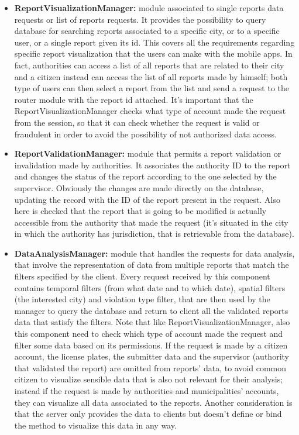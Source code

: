 \begin{itemize}
	\item \textbf{ReportVisualizationManager:}
	module associated to single reports data requests or list of reports requests. It provides the possibility to query database for searching reports associated to a specific city, or to a specific user, or a single report given its id. This covers all the requirements regarding specific report visualization that the users can make with the mobile apps. In fact, authorities can access a list of all reports that are related to their city and a citizen instead can access the list of all reports made by himself; both type of users can then select a report from the list and send a request to the router module with the report id attached. It's important that the ReportVisualizationManager checks what type of account made the request from the session, so that it can check whether the request is valid or fraudulent in order to avoid the possibility of not authorized data access. 
	\item \textbf{ReportValidationManager:}
	module that permits a report validation or invalidation made by authorities. It associates the authority ID to the report and changes the status of the report according to the one selected by the supervisor. Obviously the changes are made directly on the database, updating the record with the ID of the report present in the request. Also here is checked that the report that is going to be modified is actually accessible from the authority that made the request (it's situated in the city in which the authority has jurisdiction, that is retrievable from the database).
	\item \textbf{DataAnalysisManager:}
	module that handles the requests for data analysis, that involve the representation of data from multiple reports that match the filters specified by the client. Every request received by this component contains temporal filters (from what date and to which date), spatial filters (the interested city) and violation type filter, that are then used by the manager to query the database and return to client all the validated reports data that satisfy the filters. Note that like ReportVisualizationManager, also this component need to check which type of account made the request and filter some data based on its permissions. If the request is made by a citizen account, the license plates, the submitter data and the supervisor (authority that validated the report) are omitted from reports' data, to avoid common citizen to visualize sensible data that is also not relevant for their analysis; instead if the request is made by authorities and municipalities' accounts, they can visualize all data associated to the reports. Another consideration is that the server only provides the data to clients but doesn't define or bind the method to visualize this data in any way.   

\end{itemize}
